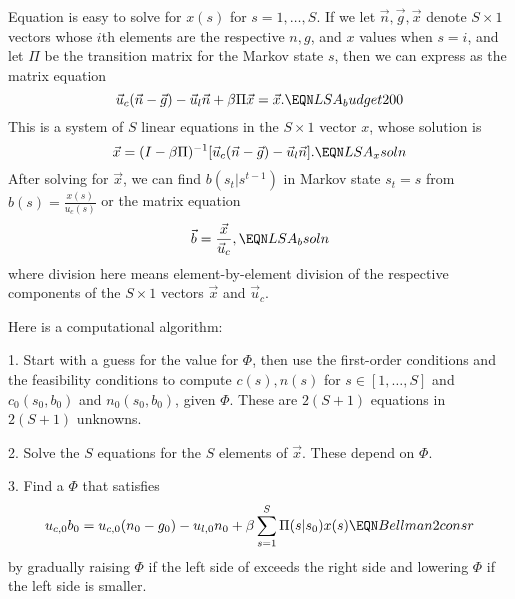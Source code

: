 Equation  is easy to solve for $x(s)$ for $s = 1, \ldots , S$.
If we let $\vec n, \vec g, \vec x$ denote $S \times 1$ vectors whose $i$th elements are the respective $n, g$, and $x$ values when $s=i$, and
let $\Pi$ be the transition matrix for the Markov state $s$, then
we can express  as the matrix equation
$$ \vec u_c(\vec n - \vec g) -\vec u_l \vec n  + \beta \Pi \vec x = \vec x . \EQN LSA_budget200 $$ %
This is a system of $S$ linear equations in the $S \times 1$ vector $x$, whose solution is %
$$ \vec x= (I - \beta \Pi )^{-1} [ \vec u_c (\vec n-\vec g) - \vec u_l \vec n] . \EQN LSA_xsoln $$
After solving  for $\vec x$, we can find $b(s_t|s^{t-1})$ in Markov state $s_t=s$
from $ b(s) = {\frac{x(s)}{u_c(s)}} $ or
the matrix equation
$$ \vec b = {\frac{ \vec x }{\vec u_c}} ,  \EQN LSA_bsoln $$
where division here means element-by-element division of the respective components of the $S \times 1$ vectors $\vec x$ and $\vec u_c$.


Here is a computational algorithm:

\medskip

\item{1.} Start with a guess for the value for $\Phi$,  then use the first-order conditions    and the
feasibility conditions 
 to compute $c(s), n(s)$ for  $s \in [1,\ldots , S] $  and
$c_0(s_0,b_0)$ and $n_0(s_0, b_0)$, given $\Phi$.  These are $2  (S+1)$ equations in $2  (S+1)$ unknowns.

\medskip

\item{2.} Solve the $S$ equations  for the $S$ elements of $\vec x$.  These depend on $\Phi$. %

\medskip

\item{3.}  Find a $\Phi$ that satisfies
$$   u_{c,0} b_0 = u_{c,0} (n_0 - g_0) - u_{l,0} n_0  + \beta \sum_{s=1}^S \Pi(s | s_0) x(s) \EQN Bellman2consr $$
 by gradually raising $\Phi$ if the
left side of   exceeds the right side  and lowering $\Phi$ if the left side is smaller.

\medskip

